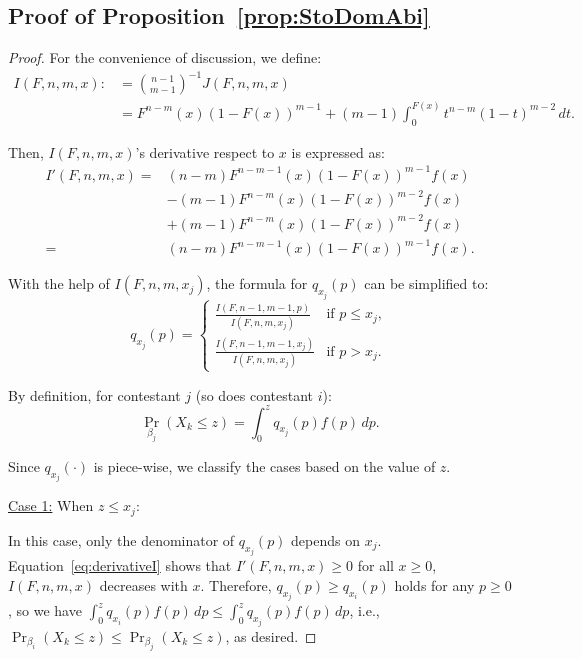 \subsection*{Proof of Proposition~\ref{prop:StoDomAbi}}
\begin{proof}
    For the convenience of discussion, we define:
    \[
    \begin{aligned}
        I(F,n,m,x) :&= \binom{n-1}{m-1}^{-1}J(F,n,m,x) \\
        & = F^{n-m}(x)(1-F(x))^{m-1}+(m-1)\int_0^{F(x)}t^{n-m}(1-t)^{m-2}\, dt.
    \end{aligned}
    \]

    Then, $I(F,n,m,x)$'s derivative respect to $x$ is expressed as:
    \begin{equation}\label{eq:derivativeI}
    \begin{aligned}
        I'(F,n,m,x) = & (n-m)F^{n-m-1}(x)(1-F(x))^{m-1}f(x) \\
        & -(m-1)F^{n-m}(x)(1-F(x))^{m-2}f(x) \\
        & +(m-1)F^{n-m}(x)(1-F(x))^{m-2}f(x) \\
        = &(n-m)F^{n-m-1}(x)(1-F(x))^{m-1}f(x).
    \end{aligned}
    \end{equation}

    With the help of $I(F,n,m,x_j)$, the formula for $q_{x_j}(p)$ can be simplified to:
    \[
    q_{x_j}(p) =
    \begin{cases} 
    \frac{I(F,n-1,m-1,p)}{I(F,n,m,x_j)} & \text{if } p \leq x_j, \\
    \frac{I(F,n-1,m-1,x_j)}{I(F,n,m,x_j)} & \text{if } p > x_j.
    \end{cases}
    \]
    
    By definition, for contestant $j$ (so does contestant $i$):
    \[
    \Pr_{\beta_j}(X_k \leq z) = \int_0^{z}q_{x_j}(p)f(p)\, dp.
    \]

    Since $q_{x_j}(\cdot)$ is piece-wise, we classify the cases based on the value of $z$. 

    \underline{Case 1:} When $z \leq x_j$:

    In this case, only the denominator of $q_{x_j}(p)$ depends on $x_j$. Equation~\eqref{eq:derivativeI} shows that $I'(F,n,m,x)\geq 0$ for all $x\geq0$, $I(F,n,m,x)$ decreases with $x$. Therefore, $q_{x_j}(p) \geq q_{x_i}(p)$ holds for any $p \geq 0$, so we have $\int_0^{z}q_{x_i}(p)f(p)\, dp \leq \int_0^{z}q_{x_j}(p)f(p)\, dp$, i.e.,$\Pr_{\beta_i}(X_k \leq z) \leq \Pr_{\beta_j}(X_k \leq z)$, as desired. 


\end{proof}
